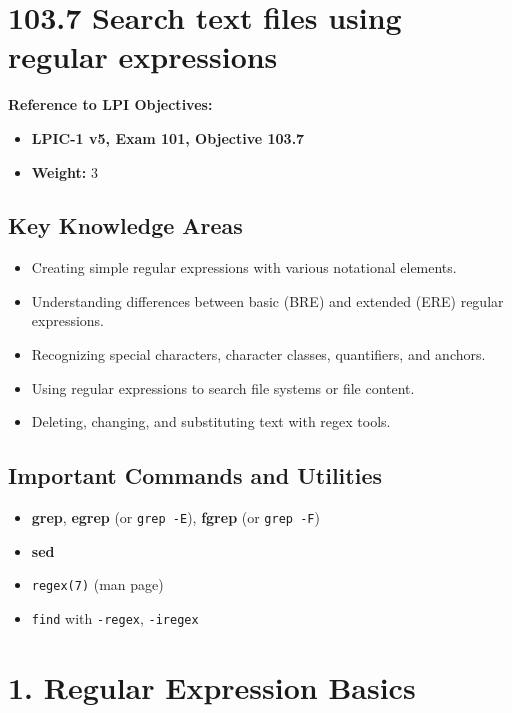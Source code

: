 \documentclass[a4paper]{report}
\begin{document}
\newpage
\section*{103.7 Search text files using regular expressions}


\textbf{Reference to LPI Objectives:}
\begin{itemize}
    \item \textbf{LPIC-1 v5, Exam 101, Objective 103.7}
    \item \textbf{Weight:} 3
\end{itemize}

\subsection*{Key Knowledge Areas}
\begin{itemize}
    \item Creating simple regular expressions with various notational elements.
    \item Understanding differences between basic (BRE) and extended (ERE) regular expressions.
    \item Recognizing special characters, character classes, quantifiers, and anchors.
    \item Using regular expressions to search file systems or file content.
    \item Deleting, changing, and substituting text with regex tools.
\end{itemize}

\subsection*{Important Commands and Utilities}
\begin{itemize}
    \item \textbf{grep}, \textbf{egrep} (or \texttt{grep -E}), \textbf{fgrep} (or \texttt{grep -F})
    \item \textbf{sed}
    \item \texttt{regex(7)} (man page)
    \item \texttt{find} with \texttt{-regex}, \texttt{-iregex}
\end{itemize}

\section*{1. Regular Expression Basics}
\end{document}
